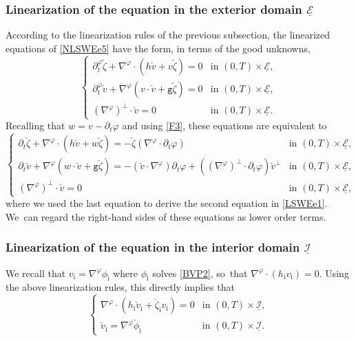 \documentclass[JEP,XML,SOM,Unicode,NoFloatCountersInSection,published]{cedram}
\newcommand{\gr}{{\mathtt g}}
\newcommand{\dt}{\partial_t}
\newcommand{\cI}{{\mathcal I}}
\newcommand{\cE}{{\mathcal E}}
\newcommand{\ul}[1]{\underline{#1}}
\theoremstyle{definition}
\begin{document}
\subsubsection{Linearization of the equation in the exterior domain $\ul{\cE}$}
According to the linearization rules of the previous subsection, the linearized equations of \eqref{NLSWEe5} have the form, in terms of the good unknowns,
\[\begin{cases}
\dt^\varphi\check{\zeta}+\nabla^\varphi\cdot(h\check{v}+v\check{\zeta}) = 0 &\text{in } (0,T)\times\ul{\cE}, \\
\dt^\varphi\check{v}+\nabla^\varphi(v\cdot\check{v}+\gr\check{\zeta}) = 0 &\text{in } (0,T)\times\ul{\cE}, \\
(\nabla^\varphi)^\perp\cdot\check{v} = 0 &\text{in } (0,T)\times\ul{\cE}.
\end{cases}
\]
Recalling that $w=v-\dt\varphi$ and using \eqref{F3}, these equations are equivalent to
\begin{equation}\label{LSWEe1}
\begin{cases}
\dt\check{\zeta}+\nabla^\varphi\cdot(h\check{v}+w\check{\zeta}) = -\check{\zeta}(\nabla^\varphi\cdot\dt\varphi) &\text{in } (0,T)\times\ul{\cE}, \\
\dt\check{v}+\nabla^\varphi(w\cdot\check{v}+\gr\check{\zeta}) = -(\check{v}\cdot\nabla^\varphi)\dt\varphi+((\nabla^\varphi)^\perp\cdot\dt\varphi)\check{v}^\perp
&\text{in } (0,T)\times\ul{\cE}, \\
(\nabla^\varphi)^\perp\cdot\check{v} = 0 &\text{in } (0,T)\times\ul{\cE},
\end{cases}
\end{equation}
where we used the last equation to derive the second equation in \eqref{LSWEe1}. We~can regard the right-hand sides of these equations as lower order terms.

\subsubsection{Linearization of the equation in the interior domain $\ul{\cI}$}
We recall that $v_\mathrm{i}=\nabla^\varphi\phi_\mathrm{i}$ where $\phi_\mathrm{i}$ solves \eqref{BVP2}, so~that $\nabla^\varphi\cdot(h_\mathrm{i}v_\mathrm{i})=0$.
Using the above linearization rules, this directly implies that
\begin{equation}\label{LSWEi1}
\begin{cases}
\nabla^\varphi\cdot(h_\mathrm{i}\check{v}_\mathrm{i}+\check{\zeta}_\mathrm{i} v_\mathrm{i}) = 0 &\text{in } (0,T)\times\ul{\cI}, \\
\check{v}_\mathrm{i}=\nabla^\varphi\check{\phi}_\mathrm{i} &\text{in } (0,T)\times\ul{\cI}.
\end{cases}
\end{equation}
\end{document}
